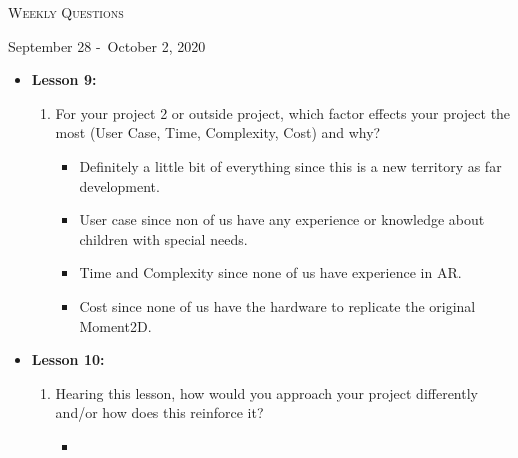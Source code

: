 \centerline{\LARGE\textsc{Weekly Questions}}
\centerline{September 28 -\ October 2, 2020}
\textbf{}
\begin{itemize}
  \item[] \textbf{\large Lesson 9:}
  \begin{enumerate}
    \item For your project 2 or outside project, which factor effects your project the most (User Case, Time, Complexity, Cost) and why?
    \begin{itemize}
      \item Definitely a little bit of everything since this is a new territory as far development. 
      \item User case since non of us have any experience or knowledge about children with special needs. 
      \item Time and Complexity since none of us have experience in AR.\
      \item Cost since none of us have the hardware to replicate the original Moment2D.
    \end{itemize}
  \end{enumerate} 
\end{itemize}
\begin{itemize}
  \item[] \textbf{\large Lesson 10:}
  \begin{enumerate}
    \item Hearing this lesson, how would you approach your project differently and/or how does this reinforce it?
    \begin{itemize}
      \item 
    \end{itemize}
  \end{enumerate} 
\end{itemize}

